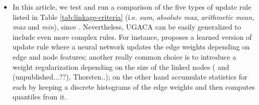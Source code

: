 \begin{itemize}
\item In this article, we test and run a comparison of the five types of update rule listed in Table \ref{tab:linkage-criteria} (i.e. \emph{sum}, \emph{absolute max}, \emph{arithmetic mean}, \emph{max} and \emph{min}), since . Nevertheless, UGACA can be easily generalized to include even more complex rules. For instance, \cite{nunez2013machine} proposes a learned version of update rule where a neural network updates the edge weights depending on edge and node features; another really common choice is to introduce a weight regularization depending on the size of the linked nodes (\cite{felzenszwalb2004efficient} and \cite{kardoostsolving} (unpublished...??), Thorsten..); 
\cite{funke2018large} on the other hand accumulate statistics for each  by keeping a discrete histograms of the edge weights and then computes quantiles from it.
\end{itemize}



            




